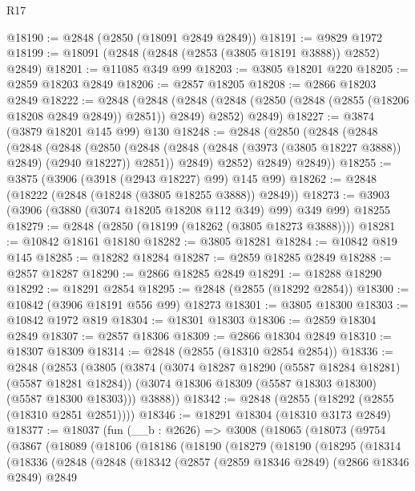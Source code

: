 \begin{lexlean}{R17}
\begin{coremodule}
@18190 := @2848 (@2850 (@18091 @2849 @2849))
@18191 := @9829 @1972
@18199 := @18091 (@2848 (@2848 (@2853 (@3805 @18191 @3888)) @2852) @2849)
@18201 := @11085 @349 @99
@18203 := @3805 @18201 @220
@18205 := @2859 @18203 @2849
@18206 := @2857 @18205
@18208 := @2866 @18203 @2849
@18222 := @2848
    (@2848
      (@2848 (@2848 (@2850 (@2848 (@2855 (@18206 @18208 @2849 @2849)) @2851)) @2849) @2852)
      @2849)
@18227 := @3874 (@3879 @18201 @145 @99) @130
@18248 := @2848
    (@2850
      (@2848
        (@2848
          (@2848
            (@2848
              (@2850
                (@2848 (@2848 (@2848 (@3973 (@3805 @18227 @3888)) @2849) (@2940 @18227)) @2851))
              @2849)
            @2852)
          @2849)
        @2849))
@18255 := @3875 (@3906 (@3918 (@2943 @18227) @99) @145 @99)
@18262 := @2848 (@18222 (@2848 (@18248 (@3805 @18255 @3888)) @2849))
@18273 := @3903 (@3906 (@3880 (@3074 @18205 @18208 @112 @349) @99) @349 @99) @18255
@18279 := @2848 (@2850 (@18199 (@18262 (@3805 @18273 @3888))))
@18281 := @10842 @18161 @18180
@18282 := @3805 @18281
@18284 := @10842 @819 @145
@18285 := @18282 @18284
@18287 := @2859 @18285 @2849
@18288 := @2857 @18287
@18290 := @2866 @18285 @2849
@18291 := @18288 @18290
@18292 := @18291 @2854
@18295 := @2848 (@2855 (@18292 @2854))
@18300 := @10842 (@3906 @18191 @556 @99) @18273
@18301 := @3805 @18300
@18303 := @10842 @1972 @819
@18304 := @18301 @18303
@18306 := @2859 @18304 @2849
@18307 := @2857 @18306
@18309 := @2866 @18304 @2849
@18310 := @18307 @18309
@18314 := @2848 (@2855 (@18310 @2854 @2854))
@18336 := @2848
    (@2853
      (@3805
        (@3874
          (@3074 @18287 @18290 (@5587 @18284 @18281) (@5587 @18281 @18284))
          (@3074 @18306 @18309 (@5587 @18303 @18300) (@5587 @18300 @18303)))
        @3888))
@18342 := @2848 (@2855 (@18292 (@2855 (@18310 @2851 @2851))))
@18346 := @18291 @18304 (@18310 @3173 @2849)
@18377 := @18037
    (fun (__b : @2626) =>
    @3008
      (@18065
        (@18073
          (@9754
            (@3867
              (@18089
                (@18106
                  (@18186
                    (@18190
                      (@18279
                        (@18190
                          (@18295
                            (@18314
                              (@18336
                                (@2848
                                  (@2848
                                    (@18342
                                      (@2857
                                        (@2859 @18346 @2849)
                                        (@2866 @18346 @2849)
                                        @2849

\end{coremodule}
\end{lexlean}
